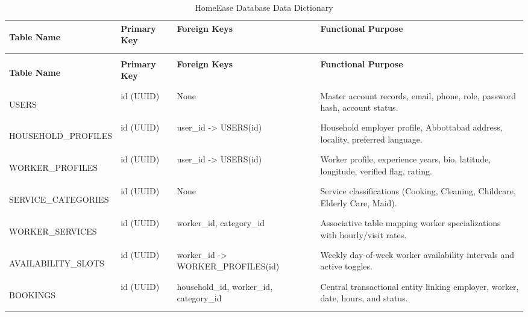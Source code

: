 \documentclass[12pt,a4paper]{article}
\begin{document}
\begingroup
{}
\fontsize{10}{11.5}\selectfont
\setlength{\tabcolsep}{4pt}
\setlength{\extrarowheight}{2pt}
\setlength{\LTpre}{6pt}
\setlength{\LTpost}{10pt}
\begin{longtable}{|>{\bfseries\raggedright\arraybackslash}p{\dimexpr(\linewidth-8\tabcolsep-5\arrayrulewidth)/4\relax}|>{\raggedright\arraybackslash}p{\dimexpr(\linewidth-8\tabcolsep-5\arrayrulewidth)/4\relax}|>{\raggedright\arraybackslash}p{\dimexpr(\linewidth-8\tabcolsep-5\arrayrulewidth)/4\relax}|>{\raggedright\arraybackslash}p{\dimexpr(\linewidth-8\tabcolsep-5\arrayrulewidth)/4\relax}|}
\caption{HomeEase Database Data Dictionary}\label{tab:data-dictionary}\\
\hline
\textbf{Table Name} & \textbf{Primary Key} & \textbf{Foreign Keys} & \textbf{Functional Purpose} \\ \hline
\endfirsthead
\multicolumn{4}{c}{Table \thetable\ HomeEase Database Data Dictionary (continued)}\\
\hline
\textbf{Table Name} & \textbf{Primary Key} & \textbf{Foreign Keys} & \textbf{Functional Purpose} \\ \hline
\endhead
\endfoot
\endlastfoot
USERS & id (UUID) & None & Master account records, email, phone, role, password hash, account status. \\ \hline
HOUSEHOLD\_\allowbreak{}PROFILES & id (UUID) & user\_\allowbreak{}id -> USERS(id) & Household employer profile, Abbottabad address, locality, preferred language. \\ \hline
WORKER\_\allowbreak{}PROFILES & id (UUID) & user\_\allowbreak{}id -> USERS(id) & Worker profile, experience years, bio, latitude, longitude, verified flag, rating. \\ \hline
SERVICE\_\allowbreak{}CATEGORIES & id (UUID) & None & Service classifications (Cooking, Cleaning, Childcare, Elderly Care, Maid). \\ \hline
WORKER\_\allowbreak{}SERVICES & id (UUID) & worker\_\allowbreak{}id, category\_\allowbreak{}id & Associative table mapping worker specializations with hourly/\allowbreak{}visit rates. \\ \hline
AVAILABILITY\_\allowbreak{}SLOTS & id (UUID) & worker\_\allowbreak{}id -> WORKER\_\allowbreak{}PROFILES(id) & Weekly day-of-week worker availability intervals and active toggles. \\ \hline
BOOKINGS & id (UUID) & household\_\allowbreak{}id, worker\_\allowbreak{}id, category\_\allowbreak{}id & Central transactional entity linking employer, worker, date, hours, and status. \\ \hline

\end{longtable}
\end{document}
